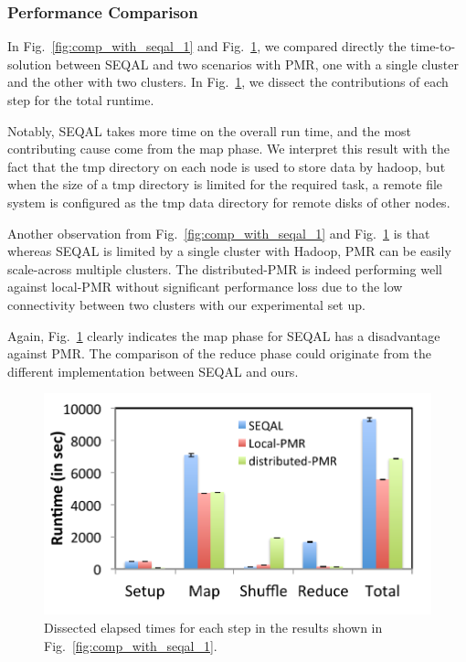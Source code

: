 \documentclass{sig-alternate}
\begin{document}
\subsubsection{Performance Comparison}
In Fig.~\ref{fig:comp_with_seqal_1} and Fig.~\ref{fig:comp_with_seqal_2}, we compared directly the time-to-solution between SEQAL and two scenarios with PMR, one with a single cluster and the other with two clusters.  In Fig.~\ref{fig:comp_with_seqal_2}, we dissect the contributions of each step for the total runtime.  

Notably, SEQAL takes more time on the overall run time, and the most contributing cause come from the map phase.  We interpret this result with the fact that the tmp directory on each node is used to store data by hadoop, but when the size of a tmp directory is limited for the required task, a remote file system is configured as  the tmp data directory for remote disks of other nodes.

Another observation from Fig.~\ref{fig:comp_with_seqal_1} and Fig.~\ref{fig:comp_with_seqal_2} is that whereas SEQAL is limited by a single cluster with Hadoop, PMR can be easily scale-across multiple clusters. The distributed-PMR is indeed performing well against local-PMR without significant performance loss due to the low connectivity between two clusters with our experimental set up.  

Again, Fig.~\ref{fig:comp_with_seqal_2} clearly indicates the map phase for SEQAL has a disadvantage against PMR.  The comparison of the reduce phase could originate from the different implementation between SEQAL and ours.

\begin{figure} 
 \centering
\includegraphics[scale=0.50]{figures/8GB_phasewisetimes.pdf}
\caption{\small  Dissected elapsed times for each step in the results shown in Fig.~\ref{fig:comp_with_seqal_1}.  }
  \label{fig:comp_with_seqal_2} 
\end{figure}
\end{document}
